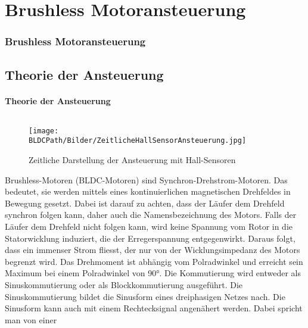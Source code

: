 \ifSTANDALONE
\section{Brushless Motoransteuerung}
\fi
\ifEMBED
\subsubsection{Brushless Motoransteuerung}
\fi

\ifEMBED
    \BLDCcollab
\fi
\ifSTANDALONE
    \subsection{Theorie der Ansteuerung}
    \fi
\ifEMBED
    \paragraph{Theorie der Ansteuerung}$~~$\\
    \fi
    \ifEMBED
        \begin{wrapfigure}{r}{0.50\textwidth}
           	\texttt{[image: \\BLDCPath/Bilder/ZeitlicheHallSensorAnsteuerung.jpg]}
         	\centering
           	\caption[Zeitliche Darstellung der Ansteuerung mit Hall-Sensoren]
           	{Zeitliche Darstellung der Ansteuerung mit Hall-Sensoren \cite{AppNote:BrushlessuC}}
            \label{abb:ZeitlicheAnsteuerungBrushlessMotor}
        \end{wrapfigure}
    \fi
        Brushless-Motoren (BLDC-Motoren) sind Synchron-Drehstrom-Motoren. Das 
        bedeutet, sie werden mittels eines kontinuierlichen magnetischen 
        Drehfeldes in Bewegung gesetzt.  Dabei ist darauf zu achten, dass der 
        Läufer dem Drehfeld synchron folgen kann, daher auch die 
        Namensbezeichnung des Motors. Falls der Läufer dem Drehfeld nicht 
        folgen kann, wird keine Spannung vom Rotor in die Statorwicklung 
        induziert, die der Erregerspannung entgegenwirkt. Daraus folgt, dass 
        ein immenser Strom fliesst, der nur von der Wicklungsimpedanz des 
        Motors begrenzt wird. Das Drehmoment ist abhängig vom Polradwinkel und 
        erreicht sein Maximum bei einem Polradwinkel von 90\si{\degree}. Die 
        Kommutierung wird entweder als Sinuskommutierung oder als 
        Blockkommutierung ausgeführt. Die Sinuskommutierung bildet die 
        Sinusform eines dreiphasigen Netzes nach. Die Sinusform kann auch mit 
        einem Rechtecksignal angenähert werden. Dabei spricht man von einer 
